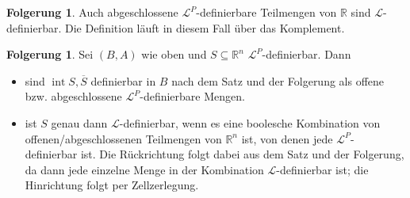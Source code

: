 \documentclass[a4paper, 11pt]{report}
\newcommand{\lingua}{\mathcal{L}}
\newcommand{\setR}{\mathbb{R}}
\DeclareMathOperator{\inn}{int}
\theoremstyle{definition}
\newtheorem{corollary}[subsection]{Folgerung}
\begin{document}
\begin{corollary}
	Auch abgeschlossene $\lingua^P$-definierbare Teilmengen von $\setR$ sind $\lingua$-definierbar. Die Definition läuft in diesem Fall über das Komplement.
\end{corollary}
\begin{corollary}
	Sei $(B,A)$ wie oben und $S\subseteq\setR^n$ $\lingua^P$-definierbar. Dann
	\begin{itemize}
		\item sind $\inn S,\overline{S}$ definierbar in $B$ nach dem Satz und der Folgerung als offene bzw. abgeschlossene $\lingua^P$-definierbare Mengen.
		\item ist $S$ genau dann $\lingua$-definierbar, wenn es eine boolesche Kombination von offenen/abgeschlossenen Teilmengen von $\setR^n$ ist, von denen jede $\lingua^P$-definierbar ist. Die Rückrichtung folgt dabei aus dem Satz und der Folgerung, da dann jede einzelne Menge in der Kombination $\lingua$-definierbar ist; die Hinrichtung folgt per Zellzerlegung.
	\end{itemize}
\end{corollary}
\end{document}
